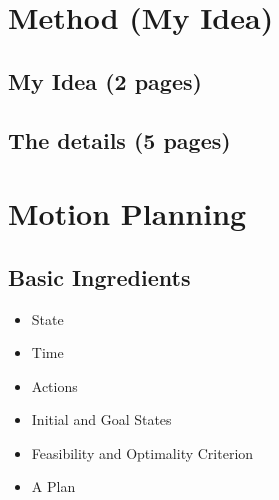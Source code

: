 \chapter{Method (My Idea)}


\section{My Idea (2 pages)}

\section{The details (5 pages)}

\chapter{Motion Planning}
\section{Basic Ingredients}
\begin{itemize}
\item State
\item Time
\item Actions
\item Initial and Goal States
\item Feasibility and Optimality Criterion
\item A Plan
\end{itemize}

